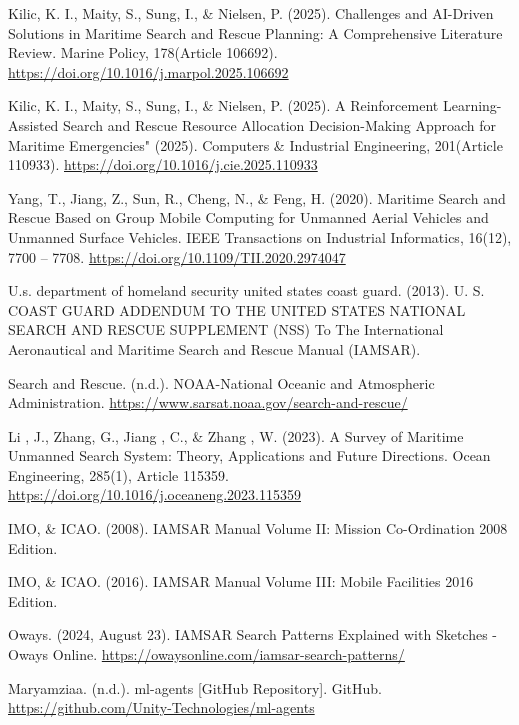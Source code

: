 \documentclass[12pt,a4paper]{article}
\begin{document}
\begin{thebibliography}{9}

Kilic, K. I., Maity, S., Sung, I., \& Nielsen, P. 
(2025). 
Challenges and AI-Driven Solutions in Maritime Search and Rescue Planning: A Comprehensive Literature Review. Marine Policy, 178(Article 106692). 
\url{https://doi.org/10.1016/j.marpol.2025.106692}

Kilic, K. I., Maity, S., Sung, I., \& Nielsen, P. 
(2025). 
A Reinforcement Learning-Assisted Search and Rescue Resource Allocation Decision-Making Approach for Maritime Emergencies" (2025). Computers \& Industrial Engineering, 201(Article 110933). 
\url{https://doi.org/10.1016/j.cie.2025.110933}

Yang, T., Jiang, Z., Sun, R., Cheng, N., \& Feng, H.
(2020). 
Maritime Search and Rescue Based on Group Mobile Computing for Unmanned Aerial Vehicles and Unmanned Surface Vehicles. IEEE Transactions on Industrial Informatics, 16(12), 7700 – 7708. 
\url{https://doi.org/10.1109/TII.2020.2974047}

U.s. department of  homeland security united states  coast guard. 
(2013). 
U. S. COAST GUARD ADDENDUM TO THE UNITED STATES NATIONAL SEARCH AND RESCUE SUPPLEMENT (NSS) To The International Aeronautical and Maritime Search and Rescue Manual (IAMSAR).

Search and Rescue. 
(n.d.). 
NOAA-National Oceanic and Atmospheric Administration. 
\url{https://www.sarsat.noaa.gov/search-and-rescue/}

Li , J., Zhang, G., Jiang , C., \& Zhang , W. 
(2023). 
A Survey of Maritime Unmanned Search System: Theory, Applications and Future Directions. Ocean Engineering, 285(1), Article 115359. 
\url{https://doi.org/10.1016/j.oceaneng.2023.115359}

IMO, \& ICAO. 
(2008). 
IAMSAR Manual Volume II: Mission Co-Ordination 2008 Edition.

IMO, \& ICAO.  
(2016). 
IAMSAR Manual Volume III: Mobile Facilities 2016 Edition.

Oways.
(2024, August 23). 
IAMSAR Search Patterns Explained with Sketches - Oways Online. 
\url{https://owaysonline.com/iamsar-search-patterns/}

Maryamziaa. 
(n.d.). 
ml-agents [GitHub Repository]. GitHub. 
\url{https://github.com/Unity-Technologies/ml-agents}


\end{thebibliography}
\end{document}
